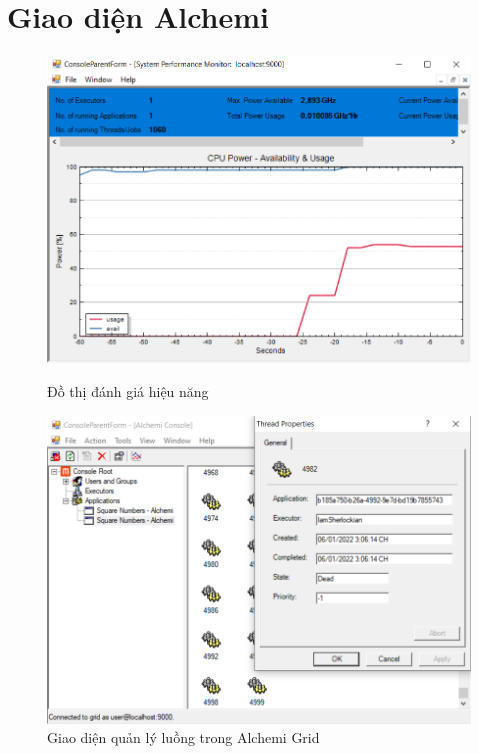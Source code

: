 \documentclass[12pt,a4paper]{report}
\begin{document}
\section{Giao diện Alchemi}
\begin{center}
    \begin{figure}[htp]
    \begin{center}
     	\includegraphics[scale=.6]{./Figures/SquareNumbers/Graph}
     	\caption{Đồ thị đánh giá hiệu năng}
  
     	\includegraphics[scale=.6]{./Figures/SquareNumbers/Manage}
    	\caption{Giao diện quản lý luồng trong Alchemi Grid}
    \end{center}
    \end{figure}
\end{center}
\end{document}
